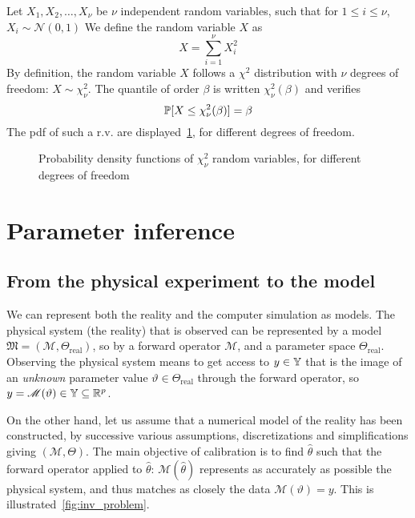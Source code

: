 \documentclass[../../Main_ManuscritThese.tex]{subfiles}
\newcommand\imgpath{/home/victor/acadwriting/Manuscrit/Text/Chapter2/img/}
\begin{document}
\begin{example}
  \label{ex:chi2}
  Let $X_1, X_2,\dots,X_{\nu}$ be $\nu$ independent random variables, such that for $1\leq i \leq \nu$, $X_i \sim \mathcal{N}(0,1)$
  We define the random variable $X$ as
  \begin{equation}
    X = \sum_{i=1}^\nu X_i^2
  \end{equation}
  By definition, the random variable $X$ follows a $\chi^2$ distribution with $\nu$ degrees of freedom: $X\sim \chi^2_{\nu}$. The quantile of order $\beta$ is written $\chi^2_{\nu}(\beta)$ and verifies
  \begin{equation}
    \mathbb{P}[X \leq \chi^2_{\nu}(\beta)] = \beta 
  \end{equation}
  The pdf of such a r.v. are displayed~\cref{fig:chi2_examples}, for different degrees of freedom.
\end{example}

\begin{figure}[ht]
  \centering
  
  \caption{Probability density functions of $\chi^2_{\nu}$ random variables, for different degrees of freedom}
  \label{fig:chi2_examples}
\end{figure}


\clearpage


\section{Parameter inference}
\label{sec:parameter_inference}
\subsection{From the physical experiment to the model}
\label{ssec:inv_problem}
We can represent both the reality and the computer simulation as models.
The physical system (the reality) that is observed can be represented by a model $\mathfrak{M}=\left(\mathscr{M},\Theta_{\mathrm{real}}\right)$, so by a forward operator $\mathscr{M}$, and a parameter space $\Theta_{\mathrm{real}}$.
Observing the physical system means to get access to $y\in \mathbb{Y}$ that is the image of an \emph{unknown} parameter value $\vartheta \in \Theta_{\mathrm{real}}$ through the forward operator, so $y = \mathscr{M}(\vartheta)\in \mathbb{Y} \subseteq \mathbb{R}^p$.

On the other hand, let us assume that a numerical model of the reality has been constructed, by successive various assumptions, discretizations and simplifications giving $(\mathcal{M},\Theta)$. The main objective of calibration is to find $\hat{\theta}$ such that the forward operator applied to $\hat{\theta}$: $\mathcal{M}(\hat{\theta})$ represents as accurately as possible the physical system, and thus matches as closely the data $\mathscr{M}(\vartheta)=y$. This is illustrated~\cref{fig:inv_problem}.
\end{document}
